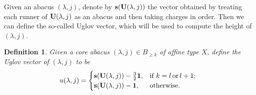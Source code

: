 \documentclass[11pt]{amsart}
\theoremstyle{plain}
\numberwithin{equation}{subsection}
\newtheorem{definition}[theorem]{Definition}
\newcommand{\lam}{\lambda}
\begin{document}
Given an abacus $(\lam, j)$, denote by ${\rm\bf s}({\rm\bf U}(\lam, j))$ the vector obtained 
by treating each runner of ${\rm\bf U}(\lam, j)$ as an abacus and then taking charges in order.
Then we can define the so-called Uglov vector, which will be used to compute the height of $(\lam, j)$.

\begin{definition}\label{3.3}
Given a core abacus $(\lam, j)\in B_{\geq k}$ of affine type $X$, define the Uglov vector of $(\lam, j)$ to be
$$u(\lam, j)=\begin{cases}
        {\rm\bf s}({\rm\bf U}(\lam, j))-\frac{3}{2}{\bf 1}, & \mbox{\rm if } k=l\, {\rm or}\, l+1; \\
        {\rm\bf s}({\rm\bf U}(\lam, j))-{\bf 1}, & \mbox{\rm otherwise}.
      \end{cases}$$
\end{definition}
\end{document}

